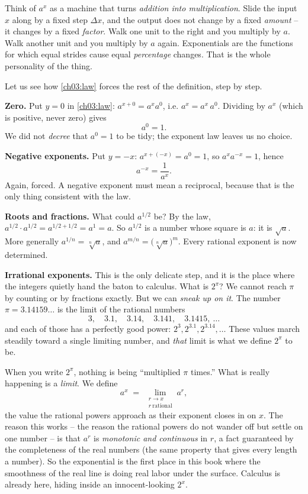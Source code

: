 \begin{intuitionbox}
Think of $a^x$ as a machine that turns \emph{addition into multiplication}. Slide the input $x$ along by a fixed step $\Delta x$, and the output does not change by a fixed \emph{amount} -- it changes by a fixed \emph{factor}. Walk one unit to the right and you multiply by $a$. Walk another unit and you multiply by $a$ again. Exponentials are the functions for which equal strides cause equal \emph{percentage} changes. That is the whole personality of the thing.
\end{intuitionbox}

Let us see how \eqref{ch03:law} forces the rest of the definition, step by step.

\textbf{Zero.} Put $y=0$ in \eqref{ch03:law}: $a^{x+0}=a^x a^0$, i.e. $a^x = a^x\, a^0$. Dividing by $a^x$ (which is positive, never zero) gives
\[
a^0 = 1.
\]
We did not \emph{decree} that $a^0=1$ to be tidy; the exponent law leaves us no choice.

\textbf{Negative exponents.} Put $y=-x$: $a^{x+(-x)} = a^0 = 1$, so $a^x a^{-x}=1$, hence
\[
a^{-x} = \frac{1}{a^x}.
\]
Again, forced. A negative exponent must mean a reciprocal, because that is the only thing consistent with the law.

\textbf{Roots and fractions.} What could $a^{1/2}$ be? By the law, $a^{1/2}\cdot a^{1/2} = a^{1/2+1/2}=a^1=a$. So $a^{1/2}$ is a number whose square is $a$: it is $\sqrt{a}$. More generally $a^{1/n}=\sqrt[n]{a}$, and $a^{m/n}=\big(\sqrt[n]{a}\big)^m$. Every rational exponent is now determined.

\textbf{Irrational exponents.} This is the only delicate step, and it is the place where the integers quietly hand the baton to calculus. What is $2^{\pi}$? We cannot reach $\pi$ by counting or by fractions exactly. But we can \emph{sneak up on it}. The number $\pi = 3.14159\ldots$ is the limit of the rational numbers
\[
3,\quad 3.1,\quad 3.14,\quad 3.141,\quad 3.1415,\ \ldots
\]
and each of those has a perfectly good power: $2^3, 2^{3.1}, 2^{3.14}, \ldots$ These values march steadily toward a single limiting number, and \emph{that} limit is what we define $2^{\pi}$ to be.

\begin{happeningbox}
When you write $2^{\pi}$, nothing is being ``multiplied $\pi$ times.'' What is really happening is a \emph{limit}. We define
\[
a^x \;=\; \lim_{\substack{r\to x \\ r\ \text{rational}}} a^{r},
\]
the value the rational powers approach as their exponent closes in on $x$. The reason this works -- the reason the rational powers do not wander off but settle on one number -- is that $a^r$ is \emph{monotonic and continuous} in $r$, a fact guaranteed by the completeness of the real numbers (the same property that gives every length a number). So the exponential is the first place in this book where the smoothness of the real line is doing real labor under the surface. Calculus is already here, hiding inside an innocent-looking $2^x$.
\end{happeningbox}

